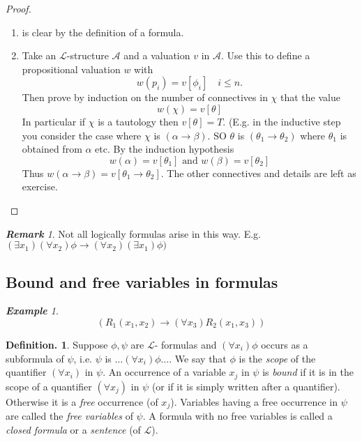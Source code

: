 \documentclass[a4paper,oneside,11pt,DIV=12,parskip=half]{scrartcl}
\newcommand{\LL}{\mathcal L}
\newcommand{\A}{\mathcal A}
\theoremstyle{plain}
\theoremstyle{definition}
\newtheorem{definition}[theorem]{Definition.}
\newtheorem{remark, definition}[theorem]{Remark and Definition.}
\newtheorem{lemma, definition}[theorem]{Lemma and Definition.}
\newtheorem{theorem, definition}[theorem]{Theorem and Definition.}
\theoremstyle{remark}
\newtheorem*{remark}{\textbf{Remark}}
\newtheorem*{example}{\textbf{Example}}
\newtheorem*{remark, example}{\textbf{Remark and Exercise}}
\begin{document}
\begin{proof}
\begin{enumerate}
    \item is clear by the definition of a formula.
    \item Take an $\LL$-structure $\A$ and a valuation $v$ in $\A$. Use this to define a propositional valuation $w$ with
        \[ w(p_i) = v[\phi_i] \quad i \leq n. \]
    Then prove by induction on the number of connectives in $\chi$ that the value
        \[ w(\chi) = v[\theta] \]
    In particular if $\chi$ is a tautology then $v[\theta] = T$. (E.g. in the inductive step you consider the case where $\chi$ is $(\alpha \rightarrow \beta)$. SO $\theta$ is $(\theta_1 \rightarrow \theta_2)$ where $\theta_1$ is obtained from $\alpha$ etc.
    By the induction hypothesis
        \[ w(\alpha) = v[\theta_1] \text{ and } w(\beta) = v[\theta_2] \]
    Thus $ w(\alpha \rightarrow \beta) = v[\theta_1 \rightarrow \theta_2].$ The other connectives and details are left as exercise.
\end{enumerate}
\end{proof}

\begin{remark}
Not all logically formulas arise in this way.
E.g. $(\exists x_1)(\forall x_2) \phi \rightarrow (\forall x_2)(\exists x_1)\phi) $
\end{remark}
\subsection{Bound and free variables in formulas}

\begin{example}
\[ (R_1(x_1,x_2) \rightarrow (\forall x_3)R_2(x_1,x_3)) \]
\end{example}

\begin{definition}
 Suppose $\phi,\psi$ are $\LL$- formulas and $(\forall x_i)\phi$ occurs as a subformula of $\psi$, i.e. $\psi$ is $\dots  (\forall x_i)\phi \dots$.
 We say that $\phi$ is the \emph{scope} of the quantifier $(\forall x_i)$ in $\psi$. An occurrence of a variable $x_j$ in $\psi$ is \emph{bound} if it is in the scope of a quantifier $(\forall x_j)$ in $\psi$ (or if it is simply written after a quantifier).
 Otherwise it is a \emph{free} occurrence (of $x_j$). Variables having a free occurrence in $\psi$ are called the \emph{free variables} of $\psi$.
 A formula with no free variables is called a \emph{closed formula} or a \emph{sentence} (of $\LL$).
\end{definition}
\end{document}
